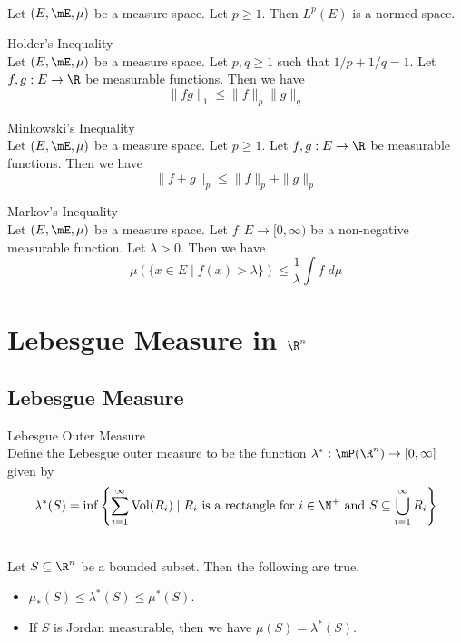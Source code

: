 \documentclass[a4paper]{article}
\begin{document}
\begin{lmm}{}{}\\
Let $(E,\mE,\mu)$ be a measure space. Let $p\geq 1$. Then $L^p(E)$ is a normed space. 
\end{lmm}

\begin{prp}{Holder's Inequality}{}\\
Let $(E,\mE,\mu)$ be a measure space. Let $p,q\geq 1$ such that $1/p+1/q=1$. Let $f,g:E\to\R$ be measurable functions. Then we have $$\|fg\|_1\leq\|f\|_p\|g\|_q$$
\end{prp}

\begin{prp}{Minkowski's Inequality}{}\\
Let $(E,\mE,\mu)$ be a measure space. Let $p\geq 1$. Let $f,g:E\to\R$ be measurable functions. Then we have $$\|f+g\|_p\leq\|f\|_p+\|g\|_p$$
\end{prp}

\begin{prp}{Markov's Inequality}{}\\
Let $(E,\mE,\mu)$ be a measure space. Let $f:E\to[0,\infty)$ be a non-negative measurable function. Let $\lambda>0$. Then we have $$\mu(\{x\in E\;|\;f(x)>\lambda\})\leq\frac{1}{\lambda}\int f\;d\mu$$
\end{prp}

\pagebreak
\section{Lebesgue Measure in $\R^n$}
\subsection{Lebesgue Measure}
\begin{defn}{Lebesgue Outer Measure}{}\\
Define the Lebesgue outer measure to be the function $\lambda^\ast:\mP(\R^n)\to[0,\infty]$ given by $$\lambda^\ast(S)=\inf\left\{\sum_{i=1}^\infty\text{Vol}(R_i)\;|\;R_i\text{ is a rectangle for }i\in\N^+\text{ and }S\subseteq\bigcup_{i=1}^\infty R_i\right\}$$
\end{defn}

\begin{prp}{}{}\\
Let $S\subseteq\R^n$ be a bounded subset. Then the following are true. 
\begin{itemize}
\item $\mu_\ast(S)\leq\lambda^\ast(S)\leq\mu^\ast(S)$. 
\item If $S$ is Jordan measurable, then we have $\mu(S)=\lambda^\ast(S)$. 
\end{itemize}
\end{prp}
\end{document}

